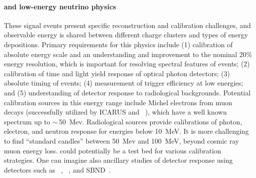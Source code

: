 \paragraph{ and low-energy neutrino physics}
These signal events present specific reconstruction and calibration challenges, and observable energy is shared between different charge clusters and types of energy depositions. Primary requirements for this physics include 
(1) calibration of absolute energy scale and an understanding and improvement to the nominal 20\% energy resolution, which is important for resolving spectral features of  events;
(2) calibration of time and light yield response of optical photon detectors;  
(3) absolute timing of events;  
(4) measurement of trigger efficiency at low energies;  and 
(5) understanding of detector response to radiological backgrounds. 
Potential calibration sources in this energy range include Michel electrons from muon decays (successfully utilized by ICARUS and ~\cite{Acciarri:2017sjy}), which have a well known spectrum up to $\sim\,$\SI{50}{Mev}. Radiological sources provide calibrations of photon, electron, and neutron response for energies below \SI{10}{\MeV}. 
It is more challenging to find ``standard candles'' between \SI{50}{Mev} and \SI{100}{\MeV}, beyond cosmic ray muon energy loss.  could potentially be a test bed for various calibration strategies. One can imagine also ancillary studies of detector response using detectors such as \lariat~\cite{Cavanna:2014iqa}, ~\cite{Acciarri:2016smi}, and SBND~\cite{Antonello:2015lea}.



